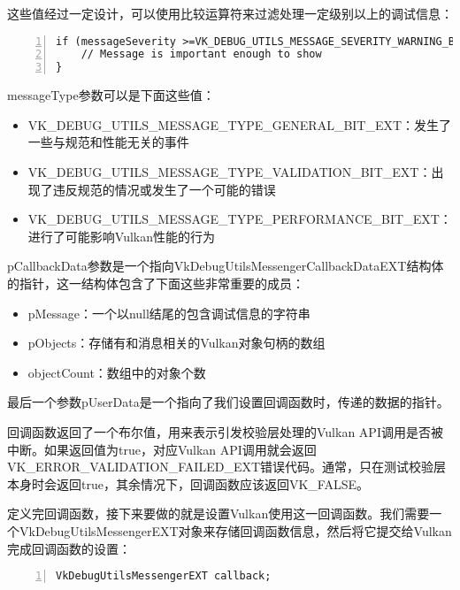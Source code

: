 \documentclass{ctexart}
\begin{document}
这些值经过一定设计，可以使用比较运算符来过滤处理一定级别以上的调试信息：

\begin{lstlisting}[language={[ANSI]C},keywordstyle=\color{blue!70},commentstyle=\color{red!50!green!50!blue!50},frame=shadowbox, rulesepcolor=\color{red!20!green!20!blue!20},basicstyle=\small,numbers=left, numberstyle=\tiny,breaklines=true]
if (messageSeverity >=VK_DEBUG_UTILS_MESSAGE_SEVERITY_WARNING_BIT_EXT) {
	// Message is important enough to show
}
\end{lstlisting}

messageType参数可以是下面这些值：

\begin{itemize}
	\item VK\_DEBUG\_UTILS\_MESSAGE\_TYPE\_GENERAL\_BIT\_EXT：发生了一些与规范和性能无关的事件
	\item VK\_DEBUG\_UTILS\_MESSAGE\_TYPE\_VALIDATION\_BIT\_EXT：出现了违反规范的情况或发生了一个可能的错误
	\item VK\_DEBUG\_UTILS\_MESSAGE\_TYPE\_PERFORMANCE\_BIT\_EXT：进行了可能影响Vulkan性能的行为
\end{itemize}

pCallbackData参数是一个指向VkDebugUtilsMessengerCallbackDataEXT结构体的指针，这一结构体包含了下面这些非常重要的成员：

\begin{itemize}
	\item pMessage：一个以null结尾的包含调试信息的字符串
	\item pObjects：存储有和消息相关的Vulkan对象句柄的数组
	\item objectCount：数组中的对象个数
\end{itemize}

最后一个参数pUserData是一个指向了我们设置回调函数时，传递的数据的指针。

回调函数返回了一个布尔值，用来表示引发校验层处理的Vulkan API调用是否被中断。如果返回值为true，对应Vulkan API调用就会返回VK\_ERROR\_VALIDATION\_FAILED\_EXT错误代码。通常，只在测试校验层本身时会返回true，其余情况下，回调函数应该返回VK\_FALSE。

定义完回调函数，接下来要做的就是设置Vulkan使用这一回调函数。我们需要一个VkDebugUtilsMessengerEXT对象来存储回调函数信息，然后将它提交给Vulkan完成回调函数的设置：

\begin{lstlisting}[language={[ANSI]C},keywordstyle=\color{blue!70},commentstyle=\color{red!50!green!50!blue!50},frame=shadowbox, rulesepcolor=\color{red!20!green!20!blue!20},basicstyle=\small,numbers=left, numberstyle=\tiny,breaklines=true]
VkDebugUtilsMessengerEXT callback;
\end{lstlisting}
\end{document}
